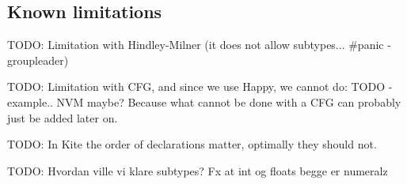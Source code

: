 
\subsection{Known limitations}
TODO: Limitation with Hindley-Milner (it does not allow subtypes... \#panic - groupleader)

TODO: Limitation with CFG, and since we use Happy, we cannot do: TODO - example.. NVM maybe? Because what cannot be done with a CFG can probably just be added later on.

TODO: In Kite the order of declarations matter, optimally they should not.

TODO: Hvordan ville vi klare subtypes? Fx at int og floats begge er numeralz
